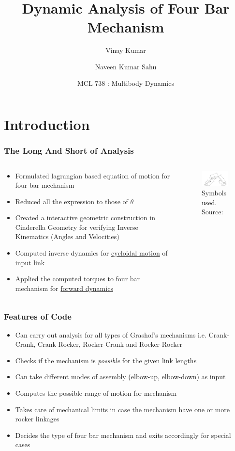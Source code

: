 \documentclass[10pt,aspectratio=169]{beamer}
\title[MCL-738]
{Dynamic Analysis of Four Bar Mechanism}
\author[IIT Delhi]
{Vinay Kumar\inst{1} \and Naveen Kumar Sahu\inst{1}}
\institute[]
{
  \inst{1}%
  Mechanical Department\\
  IIT Delhi
  \and

}
\date[\today]{MCL 738 : Multibody Dynamics}
\begin{document}
	
\frame{\titlepage}

\section{Introduction}

\begin{frame}
\frametitle{The Long And Short of Analysis}
\begin{columns}
	\begin{column}{8cm}
	\begin{itemize}
		\item Formulated lagrangian based equation of motion for four bar mechanism
		\item Reduced all the expression to those of $\theta$
		\item Created a interactive geometric construction in Cinderella Geometry \cite{Cindy} for verifying Inverse Kinematics (Angles and Velocities)
		\item Computed inverse dynamics for \alert{\href{run:./figure/crankCrank1Inverse.avi}{cycloidal motion}} of input link
		\item Applied the computed torques to four bar mechanism for \alert{\href{run:./figure/crankCrank1Forward.avi}{forward dynamics}}
	\end{itemize}
	\end{column}
	\begin{column}{6cm}
		\centering
	\begin{figure}
		\centering
		\includegraphics[width=6cm,keepaspectratio]{notation}
		\caption{Symbols used. Source:\cite{tang2006lagrangian}}
	\end{figure}
	\end{column}
\end{columns}
\end{frame}

\begin{frame}
\frametitle{Features of Code}
\begin{itemize}
	\item Can carry out analysis for all types of Grashof's mechanisms i.e. Crank-Crank, Crank-Rocker, Rocker-Crank and Rocker-Rocker
	\item Checks if the mechanism is \textit{possible} for the given link lengths
	\item Can take different modes of assembly (elbow-up, elbow-down) as input
	\item Computes the possible range of motion for mechanism
	\item Takes care of mechanical limits in case the mechanism have one or more rocker linkages
	\item Decides the type of four bar mechanism and exits accordingly for special cases \cite{wiki:fourBar}
\end{itemize}
\end{frame}
\end{document}
